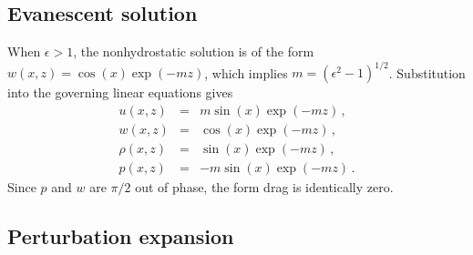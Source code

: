 \documentclass[12pt]{article}
\begin{document}
\subsection{Evanescent solution}

When $\epsilon>1$, the nonhydrostatic solution is of the form
$w(x,z) = \cos(x)\exp(-m z)$, which implies $m = (\epsilon^2-1)^{1/2}$.  Substitution into
the governing linear equations gives
\begin{eqnarray*}
u(x,z) &=& m \sin(x) \exp(-m z)\,,\\
w(x,z) &=& \cos(x) \exp(-m z)\,,\\
\rho(x,z) &=& \sin(x) \exp(-m z)\,,\\
p(x,z) &=& -m \sin(x) \exp(-m z)\,.
\end{eqnarray*}
Since $p$ and $w$ are $\pi/2$ out of phase, the form drag is identically zero.

\subsection{Perturbation expansion}
\end{document}

